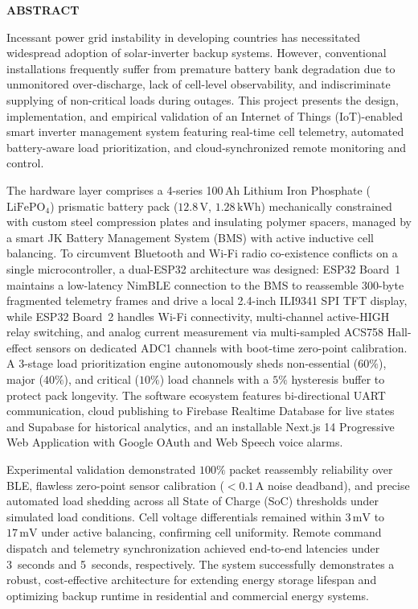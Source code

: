 \documentclass[12pt, a4paper]{report}
\begin{document}
\newpage
\setcounter{page}{5}
\thispagestyle{plain}

\begin{center}
  {\fontsize{14}{16}\bfseries ABSTRACT}
\end{center}

\vspace{10pt}

Incessant power grid instability in developing countries has necessitated widespread adoption of solar-inverter backup systems. However, conventional installations frequently suffer from premature battery bank degradation due to unmonitored over-discharge, lack of cell-level observability, and indiscriminate supplying of non-critical loads during outages. This project presents the design, implementation, and empirical validation of an Internet of Things (IoT)-enabled smart inverter management system featuring real-time cell telemetry, automated battery-aware load prioritization, and cloud-synchronized remote monitoring and control.

The hardware layer comprises a 4-series 100\,Ah Lithium Iron Phosphate ($\text{LiFePO}_4$) prismatic battery pack ($12.8\,\text{V}$, $1.28\,\text{kWh}$) mechanically constrained with custom steel compression plates and insulating polymer spacers, managed by a smart JK Battery Management System (BMS) with active inductive cell balancing. To circumvent Bluetooth and Wi-Fi radio co-existence conflicts on a single microcontroller, a dual-ESP32 architecture was designed: ESP32 Board~1 maintains a low-latency NimBLE connection to the BMS to reassemble 300-byte fragmented telemetry frames and drive a local 2.4-inch ILI9341 SPI TFT display, while ESP32 Board~2 handles Wi-Fi connectivity, multi-channel active-HIGH relay switching, and analog current measurement via multi-sampled ACS758 Hall-effect sensors on dedicated ADC1 channels with boot-time zero-point calibration. A 3-stage load prioritization engine autonomously sheds non-essential ($60\%$), major ($40\%$), and critical ($10\%$) load channels with a $5\%$ hysteresis buffer to protect pack longevity. The software ecosystem features bi-directional UART communication, cloud publishing to Firebase Realtime Database for live states and Supabase for historical analytics, and an installable Next.js 14 Progressive Web Application with Google OAuth and Web Speech voice alarms.

Experimental validation demonstrated $100\%$ packet reassembly reliability over BLE, flawless zero-point sensor calibration ($<0.1\,\text{A}$ noise deadband), and precise automated load shedding across all State of Charge (SoC) thresholds under simulated load conditions. Cell voltage differentials remained within $3\,\text{mV}$ to $17\,\text{mV}$ under active balancing, confirming cell uniformity. Remote command dispatch and telemetry synchronization achieved end-to-end latencies under 3~seconds and 5~seconds, respectively. The system successfully demonstrates a robust, cost-effective architecture for extending energy storage lifespan and optimizing backup runtime in residential and commercial energy systems.
\end{document}
